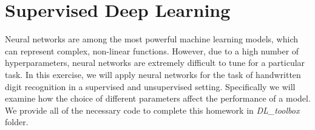\documentclass[english]{article}
\begin{document}
\section{Supervised Deep Learning}
\label{sec:sdl}

Neural networks are among the most powerful machine learning models, which can represent complex, non-linear functions. However, due to a high number of hyperparameters, neural networks are extremely difficult to tune for a particular task. In this exercise, we will apply neural networks for the task of handwritten digit recognition in a supervised and unsupervised setting. Specifically we will examine how the choice of different parameters affect the performance of a model. We provide all of the necessary code to complete this homework in \textit{DL\_toolbox} folder.


\bigskip
\end{document}
